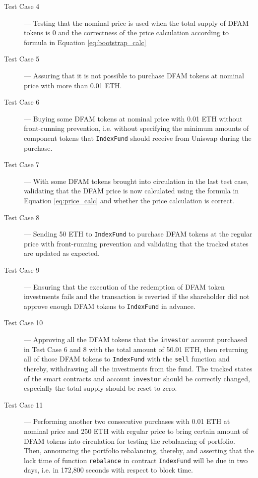 \begin{description}
    \item[Test Case 4] --- Testing that the nominal price is used when the total supply of DFAM tokens is 0 and the correctness of the price calculation according to formula in Equation \ref{eq:bootstrap_calc}

    \item[Test Case 5] --- Assuring that it is not possible to purchase DFAM tokens at nominal price with more than 0.01 ETH.
        
    \item[Test Case 6] --- Buying some DFAM tokens at nominal price with 0.01 ETH without front-running prevention, i.e. without specifying the minimum amounts of component tokens that \texttt{IndexFund} should receive from Uniswap during the purchase.
        
    \item[Test Case 7] --- With some DFAM tokens brought into circulation in the last test case, validating that the DFAM price is now calculated using the formula in Equation \ref{eq:price_calc} and whether the price calculation is correct.
    
    \item[Test Case 8] --- Sending 50 ETH to \texttt{IndexFund} to purchase DFAM tokens at the regular price with front-running prevention and validating that the tracked states are updated as expected.
    
    \item[Test Case 9] --- Ensuring that the execution of the redemption of DFAM token investments fails and the transaction is reverted if the shareholder did not approve enough DFAM tokens to \texttt{IndexFund} in advance.
    
    \item[Test Case 10] --- Approving all the  DFAM tokens that the \texttt{investor} account purchased in Test Case 6 and 8 with the total amount of 50.01 ETH, then returning all of those DFAM tokens to \texttt{IndexFund} with the \texttt{sell} function and thereby, withdrawing all the investments from the fund. The tracked states of the smart contracts and account \texttt{investor} should be correctly changed, especially the total supply should be reset to zero.
    
    \item[Test Case 11] --- Performing another two consecutive purchases with 0.01 ETH at nominal price and 250 ETH with regular price to bring certain amount of DFAM tokens into circulation for testing the rebalancing of portfolio. Then, announcing the portfolio rebalancing, thereby, and asserting that the lock time of function \texttt{rebalance} in contract \texttt{IndexFund} will be due in two days, i.e. in 172,800 seconds with respect to block time.
    

\end{description}

